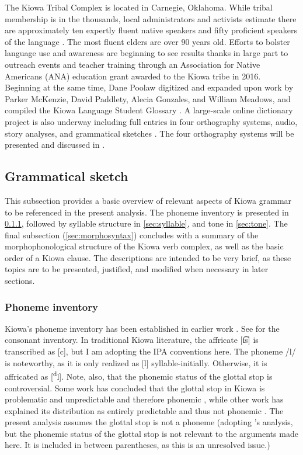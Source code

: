\documentclass[output=paper]{langscibook}
\begin{document}
The Kiowa Tribal Complex is located in Carnegie, Oklahoma. While tribal membership is in the thousands, local administrators and activists estimate there are approximately ten expertly fluent native speakers and fifty proficient speakers of the language \citep{Miller:2018}. The most fluent elders are over 90 years old. Efforts to bolster language use and awareness are beginning to see results thanks in large part to outreach events and teacher training through an Association for Native Americans (ANA) education grant awarded to the Kiowa tribe in 2016. Beginning at the same time, Dane Poolaw digitized and expanded upon work by Parker McKenzie, David Paddlety, Alecia Gonzales, and William Meadows, and compiled the Kiowa Language Student Glossary \citep{poolaw:up}. A large-scale online dictionary project is also underway including full entries in four orthography systems, audio, story analyses, and grammatical sketches \citep{miller:2019}. The four orthography systems will be presented and discussed in .

\subsection{Grammatical sketch} \label{sec:grammatical}

This subsection provides a basic overview of relevant aspects of Kiowa grammar to be referenced in the present analysis. The phoneme inventory is presented in \ref{sec:phonemes}, followed by syllable structure in \ref{sec:syllable}, and tone in \ref{sec:tone}. The final subsection (\ref{sec:morphosyntax}) concludes with a summary of the morphophonological structure of the Kiowa verb complex, as well as the basic order of a Kiowa clause. The descriptions are intended to be very brief, as these topics are to be presented, justified, and modified when necessary in later sections.

\subsubsection{Phoneme inventory} \label{sec:phonemes}

Kiowa’s phoneme inventory has been established in earlier work \citep[see][]{wonderly:1954,sivertsen:1956,merrifield:1959,Watkins:1984}. See  for the consonant inventory. In traditional Kiowa literature, the affricate [t͡s] is transcribed as [c], but I am adopting the IPA conventions here. The phoneme /l/ is noteworthy, as it is only realized as [l] syllable-initially. Otherwise, it is affricated as [\textsuperscript{d}l]. Note, also, that the phonemic status of the glottal stop is controversial. Some work has concluded that the glottal stop in Kiowa is problematic and unpredictable and therefore phonemic \citep[][]{wonderly:1954,trager:1960}, while other work has explained its distribution as entirely predictable and thus not phonemic \citep[][]{sivertsen:1956,merrifield:1959,Watkins:1984}. The present analysis assumes the glottal stop is not a phoneme (adopting \citealt{Watkins:1984}’s analysis, but the phonemic status of the glottal stop is not relevant to the arguments made here. It is included in  between parentheses, as this is an unresolved issue.)
\end{document}
